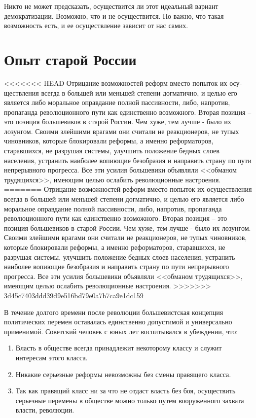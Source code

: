 \documentclass{book}
\begin{document}
Никто не может предсказать, осуществится ли этот идеальный вариант демократизации. Возможно, что и не осуществится. Но важно, что такая возможность есть, и ее осуществление зависит от нас самих.

\section{Опыт старой России}


<<<<<<< HEAD
Отрицание возможностей реформ вместо попыток их осу­ществления всегда в большей или меньшей степени догматич­но, и целью его является либо моральное оправдание полной пассивности, либо, напротив, пропаганда революционного пути как единственно возможного. Вторая позиция -- это позиция большевиков в старой России. Чем хуже, тем лучше ‑ было их лозунгом. Своими злейшими врагами они считали не реакционеров, не тупых чиновников, которые блокировали реформы, а именно реформаторов, старавшихся, не разрушая системы, улучшить положение бедных слоев населения, устранить наиболее вопиющие безобразия и направить страну по пути непрерывного прогресса. Все эти усилия большевики объявляли <<обманом трудящихся>>, имеющим целью ослабить революционные настроения.
=======
Отрицание возможностей реформ вместо попыток их осу­ществления всегда в большей или меньшей степени догматич­но, и целью его является либо моральное оправдание полной пассивности, либо, напротив, пропаганда революционного пути как единственно возможного. Вторая позиция -- это позиция большевиков в старой России. Чем хуже, тем лучше - было их лозунгом. Своими злейшими врагами они считали не реакционеров, не тупых чиновников, которые блокировали реформы, а именно реформаторов, старавшихся, не разрушая системы, улучшить положение бедных слоев населения, устранить наиболее вопиющие безобразия и направить страну по пути непрерывного прогресса. Все эти усилия большевики объявляли <<обманом трудящихся>>, имеющим целью ослабить революционные настроения.
>>>>>>> 3d45c7403ddd39d9e516bd79e0a7b7ca9e1dc159

В течение долгого времени после революции большевистская концепция политических перемен оставалась единственно допустимой и универсально применимой. Советский человек с юных лет воспитывался в убеждении, что:

\begin{enumerate}
 \item Власть в обществе всегда принадлежит некоторому клас­су и служит интересам этого класса.
 \item Никакие серьезные реформы невозможны без смены правящего класса.
 \item Так как правящий класс ни за что не отдаст власть без боя, осуществить серьезные перемены в обществе можно толь­ко путем вооруженного захвата власти, революции.
\end{enumerate}
\end{document}
